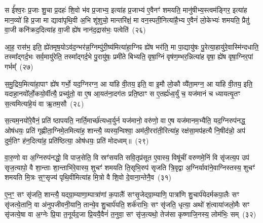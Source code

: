 स ई᳚श्व॒रः प्र॒जाः शु॒चा प्र॒दहः॑ शि॒वो भ॑व प्र॒जाभ्य॒ इत्या॑ह प्र॒जाभ्य॑ ए॒वैनꣳ॑ शमयति॒ मानु॑षीभ्य॒स्त्वम॑ङ्गिर॒ इत्या॑ह मान॒व्यो॑ हि प्र॒जा मा द्यावा॑पृथि॒वी अ॒भि शू॑शुचो॒ मान्तरि॑क्षं॒ मा वन॒स्पती॒नित्या॑है॒भ्य ए॒वैनं॑ लो॒केभ्यः॑ शमयति॒ प्रैतु॑ वा॒जी कनि॑क्रद॒दित्या॑ह वा॒जी ह्ये॑ष नान॑द॒द्रास॑भः॒ पत्वेति॑~(२६)

आ॒ह॒ रास॑भ॒ इति॒ ह्ये॑तमृष॒यो\-ऽव॑द॒न्भर॑न्न॒ग्निम्पु॑री॒ष्य॑मित्या॑हा॒ग्निꣴ ह्ये॑ष भर॑ति॒ मा पा॒द्यायु॑षः पु॒रेत्या॒हायु॑रे॒वास्मि॑न्दधाति॒ तस्मा᳚द्गर्द॒भः सर्व॒मायु॑रेति॒ तस्मा᳚द्गर्द॒भे पु॒रायु॑षः॒ प्रमी॑ते बिभ्यति॒ वृषा॒ग्निं वृष॑ण॒म्भर॒न्नित्या॑ह वृषा॒ ह्ये॑ष वृषा॒ग्निर॒पां गर्भम्᳚~(२७)

स॒मु॒द्रिय॒मित्या॑हा॒पाꣳ ह्ये॑ष गर्भो॒ यद॒ग्निरग्न॒ आ या॑हि वी॒तय॒ इति॒ वा इ॒मौ लो॒कौ व्यै॑ता॒मग्न॒ आ या॑हि वी॒तय॒ इति॒ यदाहा॒नयो᳚र्लो॒कयो॒र्वीत्यै॒ प्रच्यु॑तो॒ वा ए॒ष आ॒यत॑ना॒दग॑तः प्रति॒ष्ठाꣳ स ए॒तर्\mbox{}ह्य॑ध्व॒र्युं च॒ यज॑मानं च ध्यायत्यृ॒तꣳ स॒त्यमित्या॑हे॒यं वा ऋ॒तम॒सौ~(२८)

स॒त्यम॒नयो॑रे॒वैनं॒ प्रति॑ ष्ठापयति॒ नार्ति॒मार्च्छ॑त्यध्व॒र्युर्न यज॑मानो॒ वरु॑णो॒ वा ए॒ष यज॑मानम॒भ्यैति॒ यद॒ग्निरुप॑नद्ध॒ ओष॑धयः॒ प्रति॑ गृह्णीता॒ग्निमे॒तमित्या॑ह॒ शान्त्यै॒ व्यस्य॒न्विश्वा॒ अम॑ती॒ररा॑ती॒रित्या॑ह॒ रक्ष॑सा॒मप॑हत्यै नि॒षीद॑न्नो॒ अप॑ दुर्म॒तिꣳ ह॑न॒दित्या॑ह॒ प्रति॑ष्ठित्या॒ ओष॑धयः॒ प्रति॑ मोदध्वम्॥~(२९)

{\anuvakamend[{अ॒स्त्व॒नु॒ष्टुब॑सि सादय॒त्यारू॑ढः॒ पत्वेति॒ गर्भ॑म॒सौ मो॑दध्वं॒ द्विच॑त्वारिꣳशच्च}]}%

{{}}

वा॒रु॒णो वा अ॒ग्निरुप॑नद्धो॒ वि पाज॒सेति॒ वि स्रꣳ॑सयति सवि॒तृप्र॑सूत ए॒वास्य॒ विषू॑चीं वरुणमे॒निं वि सृ॑जत्य॒प उप॑ सृज॒त्यापो॒ वै शा॒न्ताः शा॒न्ताभि॑रे॒वास्य॒ शुचꣳ॑ शमयति ति॒सृभि॒रुप॑ सृजति त्रि॒वृद्वा अ॒ग्निर्यावा॑ने॒वाग्निस्तस्य॒ शुचꣳ॑ शमयति मि॒त्रः स॒ꣳ॒सृज्य॑ पृथि॒वीमित्या॑ह मि॒त्रो वै शि॒वो दे॒वाना॒न्तेनै॒व~(३१)

ए॒न॒ꣳ॒ सꣳ सृ॑जति॒ शान्त्यै॒ यद्ग्रा॒म्याणा॒म्पात्रा॑णां क॒पालैः᳚ सꣳसृ॒जेद्ग्रा॒म्याणि॒ पात्रा॑णि शु॒चार्प॑येदर्मकपा॒लैः सꣳ सृ॑जत्ये॒तानि॒ वा अ॑नुपजीवनी॒यानि॒ तान्ये॒व शु॒चार्प॑यति॒ शर्क॑राभिः॒ सꣳ सृ॑जति॒ धृत्या॒ अथो॑ शं॒त्वाया॑जलो॒मैः सꣳ सृ॑जत्ये॒षा वा अ॒ग्नेः प्रि॒या त॒नूर्यद॒जा प्रि॒ययै॒वैनं॑ त॒नुवा॒ सꣳ सृ॑ज॒त्यथो॒ तेज॑सा कृष्णाजि॒नस्य॒ लोम॑भिः॒ सम्~(३२)

